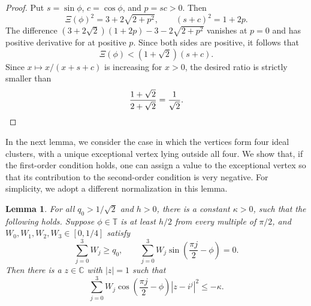 \documentclass[reqno,11pt]{amsart}
\newtheorem{lemma}{Lemma}
\theoremstyle{definition}
\newcommand{\CC}{\mathbb{C}}
\newcommand{\T}{\mathbb{T}}
\newcommand{\abs}[1]{\left\lvert #1\right\rvert}
\newcommand{\paren}[1]{\left(#1\right)}
\begin{document}
\begin{proof}
Put $s=\sin\phi$, $c=\cos\phi$, and $p=sc>0$.  Then
\[
    \Xi(\phi)^2=3+2\sqrt{2+p^2},
    \qquad (s+c)^2=1+2p.
\]
The difference $ (3+2\sqrt2)(1+2p)-3-2\sqrt{2+p^2}$ vanishes at $p=0$ and has positive derivative for at positive $p$.  Since both
sides are positive, it follows that
\[
    \Xi(\phi)<(1+\sqrt2)(s+c).
\]
Since $x\mapsto x/(x+s+c)$ is increasing for $x>0$, the desired ratio is
strictly smaller than
\[
    \frac{1+\sqrt2}{2+\sqrt2}=\frac1{\sqrt2}. \qedhere
\]
\end{proof}

In the next lemma, we consider the case in which the vertices form four ideal clusters, with a unique exceptional vertex lying outside all four. We show that, if the first-order condition holds, one can assign a value to the exceptional vertex so that its contribution to the second-order condition is very negative. For simplicity, we adopt a different normalization in this lemma.

\begin{lemma}\label{lem:exceptional-ideal-case}
For all $q_0 > 1/\sqrt2$ and $h > 0$, there is a constant $\kappa>0$, such that the following  holds.  Suppose $\phi\in\T$ is at least $h/2$ from every multiple of $\pi/2$, and $W_0,W_1,W_2,W_3\in[0,1/4]$ satisfy
\[
    \sum_{j=0}^3W_j\ge q_0,
    \qquad
    \sum_{j=0}^3W_j\sin\paren{\frac{\pi j}{2}-\phi}=0.
\]
Then there is a $z\in\CC$ with $\abs z=1$ such that
\[
    \sum_{j=0}^3W_j\cos\paren{\frac{\pi j}{2}-\phi}
       \abs{z-i^j}^2\le-\kappa.
\]
\end{lemma}
\end{document}
